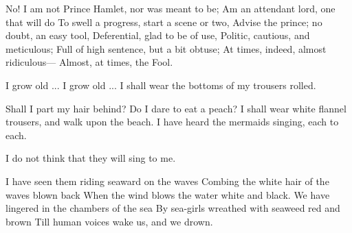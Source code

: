 \documentclass[fontsize=9, a5paper]{scrbook}
\newcommand\blankpage{%
    \null
    \thispagestyle{empty}%
    \addtocounter{page}{-1}%
    \newpage}
\begin{document}
\begin{poem}
	\pagebreak

	\begin{stanza}
		No! I am not Prince Hamlet, nor was meant to be;\verseline
		Am an attendant lord, one that will do\verseline
		To swell a progress, start a scene or two,\verseline
		Advise the prince; no doubt, an easy tool,\verseline
		Deferential, glad to be of use,\verseline
		Politic, cautious, and meticulous;\verseline
		Full of high sentence, but a bit obtuse;\verseline
		At times, indeed, almost ridiculous—\verseline
		Almost, at times, the Fool.
	\end{stanza}
	
	\begin{stanza}
		I grow old ... I grow old ...\verseline
		I shall wear the bottoms of my trousers rolled.
	\end{stanza}
	
	\begin{stanza}
		Shall I part my hair behind?   Do I dare to eat a peach?\verseline
		I shall wear white flannel trousers, and walk upon the beach.\verseline
		I have heard the mermaids singing, each to each.
	\end{stanza}
	
	\begin{stanza}
		I do not think that they will sing to me.
	\end{stanza}
	
	\begin{stanza}
		I have seen them riding seaward on the waves\verseline
		Combing the white hair of the waves blown back\verseline
		When the wind blows the water white and black.\verseline
		We have lingered in the chambers of the sea\verseline
		By sea-girls wreathed with seaweed red and brown\verseline
		Till human voices wake us, and we drown.
	\end{stanza}
\end{poem}
	\afterpage{\blankpage}
\pagebreak

\afterpage{\blankpage}
\end{document}
